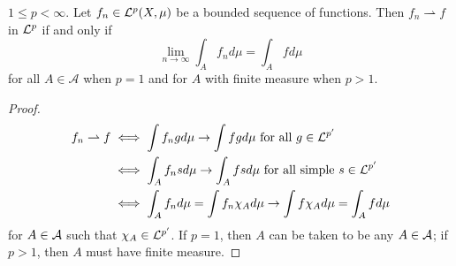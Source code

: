 \begin{proposition}\label{prop:weak_conv_on_set}
    $1\leq p<\infty$. Let $f_n\in\mathcal{L}^p(X,\mu)$ be a bounded sequence 
    of functions. Then $f_n\rightharpoonup f$ in $\mathcal{L}^p$ if and only if 
    \begin{equation*}
        \lim_{n\to\infty}\int_A f_nd\mu = \int_A fd\mu
    \end{equation*}
    for all $A\in\mathcal{A}$ when $p=1$ and for $A$ with finite 
    measure when $p>1$.
\end{proposition}
\begin{proof}
    \begin{equation*}
        \begin{split}
            f_n\rightharpoonup f 
            &\iff \int f_ngd\mu \to \int fgd\mu \text{ for all } g\in\mathcal{L}^{p'} \\
            &\iff \int_A f_nsd\mu \to \int_A fsd\mu \text{ for all simple } s\in\mathcal{L}^{p'} \\ 
            &\iff \int_A f_nd\mu = \int f_n\chi_Ad\mu \to \int f\chi_Ad\mu = \int_A fd\mu
        \end{split}
    \end{equation*}
    for $A\in\mathcal{A}$ such that $\chi_A\in\mathcal{L}^{p'}$. If $p=1$, then $A$ can be taken 
    to be any $A\in\mathcal{A}$; if $p>1$, then $A$ must have finite measure.
\end{proof}

